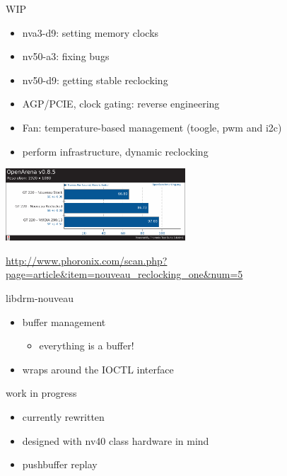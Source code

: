 \documentclass[11pt,english,compress]{beamer}
\begin{document}
		\begin{frame}
			\begin{block}{WIP}
				\begin{itemize}
					\item nva3-d9: setting memory clocks
					\item nv50-a3: fixing bugs
					\item nv50-d9: getting stable reclocking
					\item AGP/PCIE, clock gating: reverse engineering
					\item Fan: temperature-based management (toogle, pwm and i2c)
					\item perform infrastructure, dynamic reclocking
				\end{itemize}
			\end{block}

			\begin{center}
				\includegraphics[height=2.7cm]{imgs/gt220_openarena_bench.pdf}
			\end{center}
			\begin{center}
				\url{http://www.phoronix.com/scan.php?page=article&item=nouveau_reclocking_one&num=5}
			\end{center}

		\end{frame}

		\begin{frame}
			\begin{block}{libdrm-nouveau}
				\begin{itemize}
					\item buffer management
						\begin{itemize}
							\item everything is a buffer!
						\end{itemize}
					\item wraps around the IOCTL interface
				\end{itemize}
			\end{block}
			\begin{block}{work in progress}
				\begin{itemize}
					\item currently rewritten
					\item designed with nv40 class hardware in mind
					\item pushbuffer replay
				\end{itemize}
			\end{block}
		\end{frame}
\end{document}
